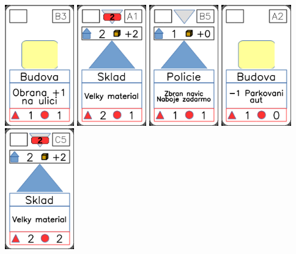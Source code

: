 \documentclass[a4paper]{article}
\begin{document}
	\includegraphics[width=3.0cm]{img-2_7}
	\includegraphics[width=3.0cm]{img-3_15}
	\includegraphics[width=3.0cm]{img-3_9}
	\includegraphics[width=3.0cm]{img-2_1}
	\includegraphics[width=3.0cm]{img-3_14}
\end{document}
